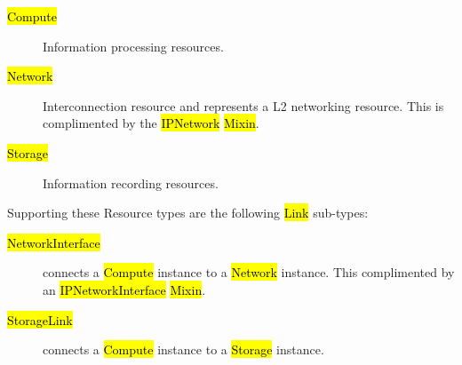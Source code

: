 \documentclass[10pt,a4paper]{article}
\begin{document}
\begin{description}
	\item[\hl{Compute}] Information processing resources.
	\item[\hl{Network}] Interconnection resource and represents a L2 networking resource. 
	This is complimented by the \hl{IPNetwork} \hl{Mixin}.
	\item[\hl{Storage}] Information recording resources.
\end{description}

Supporting these Resource types are the following \hl{Link} sub-types:

\begin{description}
	\item[\hl{NetworkInterface}] connects a \hl{Compute} instance to a \hl{Network} instance. 
	This complimented by an \hl{IPNetworkInterface} \hl{Mixin}.
	\item[\hl{StorageLink}] connects a \hl{Compute} instance to a \hl{Storage} instance.
\end{description}
\end{document}
